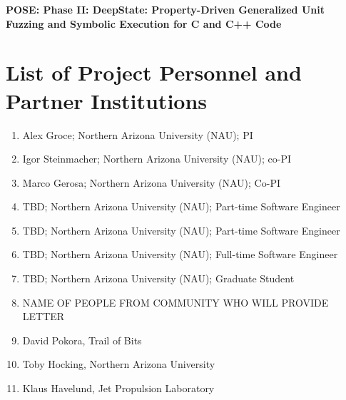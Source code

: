\documentclass[12pt]{article}
\begin{document}
\begin{center}
{\Large\sf\textbf{POSE: Phase II: DeepState: Property-Driven Generalized Unit Fuzzing and Symbolic Execution for C and C++ Code}}
\end{center}

\section*{List of Project Personnel and Partner Institutions}

\begin{enumerate}
  \item Alex Groce;  Northern Arizona University (NAU); PI
  \item Igor Steinmacher; Northern Arizona University (NAU); co-PI
  \item Marco Gerosa; Northern Arizona University (NAU); Co-PI
  \item TBD; Northern Arizona University (NAU); Part-time Software Engineer
  \item TBD; Northern Arizona University (NAU); Part-time Software Engineer
  \item TBD; Northern Arizona University (NAU); Full-time Software Engineer
  \item TBD; Northern Arizona University (NAU); Graduate Student
  \item NAME OF PEOPLE FROM COMMUNITY WHO WILL PROVIDE LETTER
  \item David Pokora, Trail of Bits
  \item Toby Hocking, Northern Arizona University
  \item Klaus Havelund, Jet Propulsion Laboratory
\end{enumerate}
\end{document}
